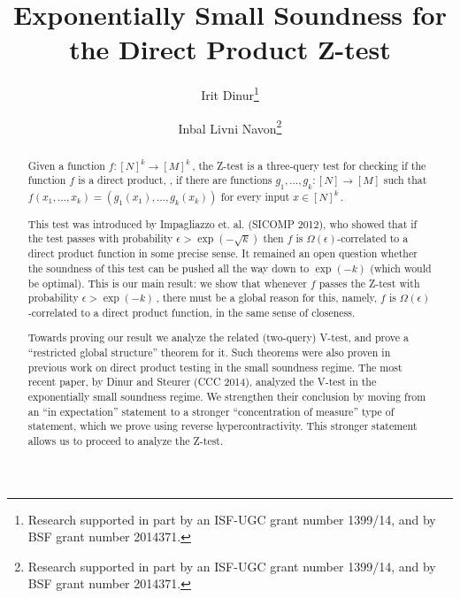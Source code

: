 \documentclass{toc}
\newcommand\f{f} %
\newcommand\pf{g} %
\begin{document}
\begin{frontmatter} %
  
%
%

%
%

 \title{Exponentially Small Soundness for the Direct Product Z-test}

%
%
%
%
%
%
%
%
%
%
%
%


%
%
%
%

%

\author[Dinur]{Irit Dinur\thanks{Research supported in part by an ISF-UGC grant number 1399/14, and by BSF grant number 2014371.}}
\author[Livni Navon]{Inbal Livni Navon\thanks{Research supported in part by an ISF-UGC grant number 1399/14, and by BSF grant number 2014371.}}

%
%
%
%

%
%
%
%
%
%
\begin{abstract}
Given a function $\f:[N]^k\rightarrow[M]^k$\,, the Z-test is a 
%
three-query  %
test for checking if the function $\f$ is a direct product,
%
\ie,  %
if there are functions $\pf_1,\ldots,\pf_k:[N]\to[M]$ such that $\f(x_1,\ldots,x_k)=(\pf_1(x_1),\ldots,\pf_k(x_k))$ for every input $x\in [N]^k$\,.

This test was introduced by Impagliazzo et. al. (SICOMP 2012), who showed that if the test passes with probability $\epsilon > \exp(-\sqrt k)$ then $\f$ is $\Omega(\epsilon)$-correlated %
to a direct product function in some precise sense. It remained an open question whether the soundness of this test can be pushed all the way down to $\exp(-k)$ (which would be optimal). This is our main result: we show that whenever $\f$ passes the 
%
Z-test %
with probability $\epsilon > \exp(-k)$\,, there must be a global reason for this, %
namely, %
%
$\f$ is 
$\Omega(\epsilon)$-correlated %
to a direct product function, in the same %
sense  %
of closeness. 

Towards proving our result we analyze the related (two-query) V-test, and prove a ``restricted global structure'' theorem for it. Such theorems were also proven in previous %
work  %
on direct product testing in the small soundness regime. The most recent
%
paper,  %
by Dinur and Steurer (CCC 2014), analyzed the %
V-test %
in the exponentially small soundness regime. We strengthen their conclusion
%
by moving from an ``in expectation'' statement to a stronger ``concentration of measure'' type of statement, which we prove using reverse
%
hypercontractivity.   %
This stronger statement allows us to proceed to analyze the %
Z-test. %
%
\end{abstract}

%

\end{frontmatter}
\end{document}
